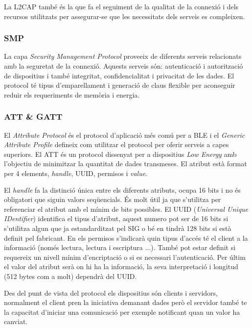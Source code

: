 La L2CAP també és la que fa el seguiment de la qualitat de la connexió i dels recursos utilitzats per assegurar-se que les necessitats dels serveis es compleixen.

\subsubsection{SMP}
La capa \textit{Security Management Protocol} proveeix de diferents serveis relacionats amb la seguretat de la connexió.
Aquests serveis són: autenticació i autorització de dispositius i també integritat, confidencialitat i privacitat de les dades.
El protocol té tipus d'emparellament i generació de claus flexible per aconseguir reduir els requeriments de memòria i energia.

\subsubsection{ATT \& GATT}
El \textit{Attribute Protocol} és el protocol d'aplicació més comú per a BLE i el \textit{Generic Attribute Profile} defineix com utilitzar el protocol per oferir serveis a capes superiors.
El ATT és un protocol dissenyat per a dispositius \textit{Low Energy} amb l'objectiu de minimitzar la quantitat de dades transmeses. El atribut està format per 4 elements, \textit{handle}, UUID, permisos  i \textit{value}.

El \textit{handle} fa la distinció única entre els diferents atributs, ocupa 16 bits i no és obligatori que siguin valors seqüencials. És molt útil ja que s'utilitza per referenciar el atribut amb el mínim de bits possibles.
El UUID (\textit{Universal Unique IDentifier}) identifica el tipus d'atribut, aquest numero pot ser de 16 bits si s'utilitza algun que ja estandarditzat pel SIG o bé en tindrà 128 bits si està definit pel fabricant.
En els permisos s'indicarà quin tipus d'accés té el client a la informació (només lectura, lectura i escriptura ...). També pot estar definit si requereix un nivell mínim d'encriptació o si es necessari l'autenticació.
Per últim el valor del atribut serà on hi ha la informació, la seva interpretació i longitud (512 bytes com a molt) dependrà del UUID.

Des del punt de vista del protocol els dispositius són clients i servidors, normalment el client pren la iniciativa demanant dades però el servidor també te la capacitat d'iniciar una comunicació per exemple notificant quan un valor ha canviat.

